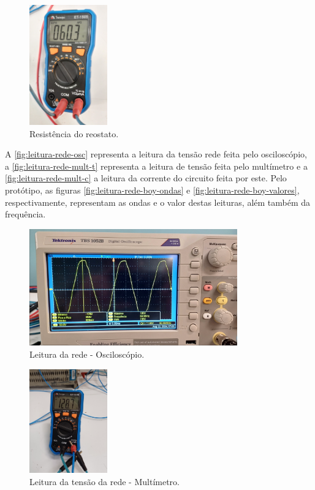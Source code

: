 \begin{figure}[htb!]
    \caption{Resistência do reostato.}
    \label{fig:resistencia-reostato-teste}
    \includegraphics[width=0.3\textwidth]{figuras/resistencia-reostato-teste.png}
    \fonte{}
\end{figure}

A \autoref{fig:leitura-rede-osc} representa a leitura da tensão rede feita pelo osciloscópio, a \autoref{fig:leitura-rede-mult-t} representa a leitura de tensão feita pelo multímetro e a \autoref{fig:leitura-rede-mult-c} a leitura da corrente do circuito feita por este. Pelo protótipo, as figuras \ref{fig:leitura-rede-boy-ondas} e \ref{fig:leitura-rede-boy-valores}, respectivamente, representam as ondas e o valor destas leituras, além também da frequência.

\begin{figure}[htb!]
    \caption{Leitura da rede - Osciloscópio.}
    \label{fig:leitura-rede-osc}
    \includegraphics[width=0.8\textwidth]{figuras/leitura-rede-osc.png}
    \fonte{}
\end{figure}

\begin{figure}[htb!]
    \caption{Leitura da tensão da rede - Multímetro.}
    \label{fig:leitura-rede-mult-t}
    \includegraphics[width=0.3\textwidth]{figuras/leitura-rede-mult-t.png}
    \fonte{}
\end{figure}

